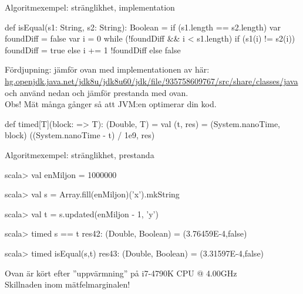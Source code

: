 \begin{Slide}{Algoritmexempel: stränglikhet, implementation}\SlideFontSmall
\begin{Code}
def isEqual(s1: String, s2: String): Boolean = {
  if (s1.length == s2.length) {
    var foundDiff = false
    var i = 0
    while (!foundDiff && i < s1.length) {
      if (s1(i) != s2(i)) foundDiff = true
      else i += 1
    }
    !foundDiff
  } else false
}
\end{Code}
\pause 
{\SlideFontTiny Fördjupning: jämför ovan med implementationen av  här:
\href{http://hg.openjdk.java.net/jdk8u/jdk8u60/jdk/file/935758609767/src/share/classes/java/lang/String.java#l976}{hg.openjdk.java.net/jdk8u/jdk8u60/jdk/file/935758609767/src/share/classes/java} \\ och använd  nedan och jämför prestanda med  ovan.\\
Obs! Mät många gånger så att JVM:en optimerar din kod.}
\vspace{-0.25em}\begin{Code}
def timed[T](block: => T): (Double, T) = { 
  val (t, res) = (System.nanoTime, block)
  ((System.nanoTime - t) / 1e9, res) 
}
\end{Code}

\end{Slide}

\begin{Slide}{Algoritmexempel: stränglikhet, prestanda}
\begin{REPL}
scala> val enMiljon = 1000000

scala> val s = Array.fill(enMiljon)('x').mkString

scala> val t = s.updated(enMiljon - 1, 'y')

scala> timed { s == t }
res42: (Double, Boolean) = (3.76459E-4,false)

scala> timed { isEqual(s,t) } 
res43: (Double, Boolean) = (3.31597E-4,false)
\end{REPL}
Ovan är kört efter ''uppvärmning'' på i7-4790K CPU @ 4.00GHz \\
Skillnaden inom mätfelmarginalen!
\end{Slide}



